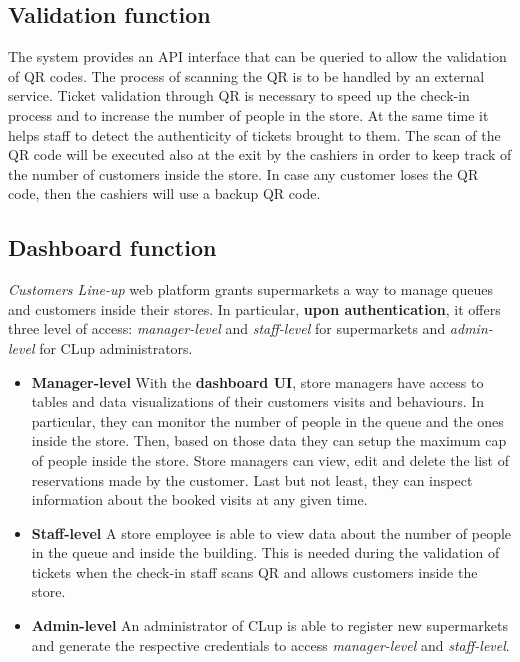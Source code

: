 \subsection{Validation function}
The system provides an API interface that can be queried to allow the validation of QR codes. The process of scanning the QR is to be handled by an external service.\newline
Ticket validation through QR is necessary to speed up the check-in process and to increase the number of people in the store. At the same time it helps staff to detect the authenticity of tickets brought to them.\newline
The scan of the QR code will be executed also at the exit by the cashiers in order to keep track of the number of customers inside the store. In case any customer loses the QR code, then the cashiers will use a backup QR code.

\subsection{Dashboard function}
\textit{Customers Line-up} web platform grants supermarkets a way to manage queues and customers inside their stores. In particular, \textbf{upon authentication}, it offers three level of access: \textit{manager-level} and \textit{staff-level} for supermarkets and \textit{admin-level} for CLup administrators.

\begin{itemize}
	\item \textbf{Manager-level}\newline
	With the \textbf{dashboard UI}, store managers have access to tables and data visualizations of their customers visits and behaviours. In particular, they can monitor the number of people in the queue and the ones inside the store. Then, based on those data they can setup the maximum cap of people inside the store.\newline
	Store managers can view, edit and delete the list of reservations made by the customer.\newline
	Last but not least, they can inspect information about the booked visits at any given time.

	\item \textbf{Staff-level}\newline
	A store employee is able to view data about the number of people in the queue and inside the building. This is needed during the validation of tickets when the check-in staff scans QR and allows customers inside the store.

    \item \textbf{Admin-level}\newline
    An administrator of CLup is able to register new supermarkets and generate the respective credentials to access \textit{manager-level} and \textit{staff-level}.
\end{itemize}


